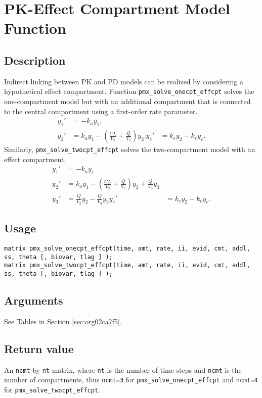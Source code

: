\documentclass[12pt, reqno, oneside]{amsbook}
\numberwithin{equation}{chapter}
\numberwithin{figure}{chapter}
\numberwithin{table}{chapter}
\theoremstyle{remark}
\begin{document}
\section{PK-Effect Compartment Model Function}
\label{sec:org9ff6f70}
\subsection{Description}
\label{sec:org997c5bb}
Indirect linking between PK and PD models can be realized by considering a hypothetical effect compartment. Function \texttt{pmx\_solve\_onecpt\_effcpt} solves the one-compartment model but with an additional compartment that is connected to the central compartment using a first-order rate parameter.
\begin{align}\label{eq:onecpt_effcpt}
  y_1' &= -k_a y_1, \\
  y_2' &= k_a y_1 - \left(\frac{CL}{V_2} + \frac{Q}{V_2}\right) y_2.
  y_e' &= k_e y_2 - k_ey_e.
\end{align}
Similarly, \texttt{pmx\_solve\_twocpt\_effcpt} solves the two-compartment model with an effect compartment.
\begin{align}\label{eq:onecpt_effcpt}
  y_1' &= -k_a y_1 \\
  y_2' &= k_a y_1 - \left(\frac{CL}{V_2} + \frac{Q}{V_2}\right) y_2 +  \frac{Q}{V_3}  y_3  \\
  y_3' &= \frac{Q}{V_2} y_2 - \frac{Q}{V_3} y_3
  y_e' &= k_e y_2 - k_ey_e.
\end{align}
\subsection{Usage}
\label{sec:orga2d9dc2}
\begin{verbatim}
matrix pmx_solve_onecpt_effcpt(time, amt, rate, ii, evid, cmt, addl, ss, theta [, biovar, tlag ] );
matrix pmx_solve_twocpt_effcpt(time, amt, rate, ii, evid, cmt, addl, ss, theta [, biovar, tlag ] );
\end{verbatim}
\subsection{Arguments}
\label{sec:org3243540}
See Tables in Section \ref{sec:org02ca7f5}.
\subsection{Return value}
\label{sec:org84c1334}
An \texttt{ncmt}-by-\texttt{nt} matrix, where \texttt{nt} is the number of time steps and \texttt{ncmt} is the number of compartments, thus \texttt{ncmt=3} for \texttt{pmx\_solve\_onecpt\_effcpt} and \texttt{ncmt=4} for \texttt{pmx\_solve\_twocpt\_effcpt}.
\end{document}
